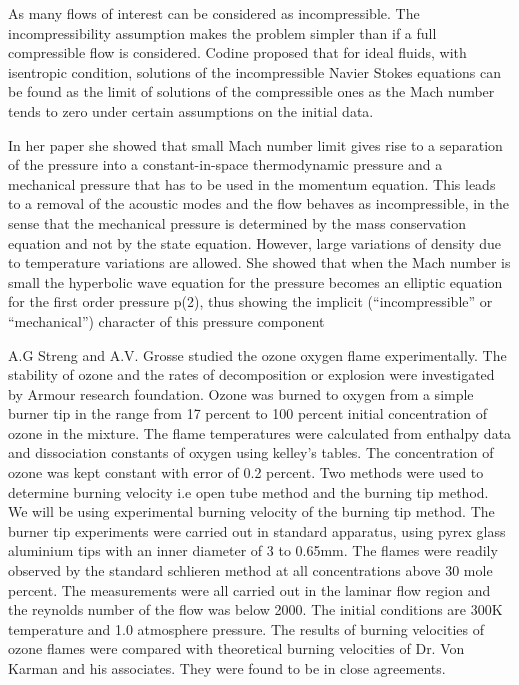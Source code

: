 \bigskip
\noindent As many flows of interest can be considered as incompressible. The incompressibility assumption makes the problem simpler than if a full compressible flow is considered. Codine  proposed that for ideal fluids, with isentropic condition, solutions of the incompressible Navier Stokes equations can be found as the limit of solutions of the compressible ones as the Mach number tends to zero under certain assumptions on the initial data.

\noindent In her paper she showed that small Mach number limit gives rise to a separation of the pressure into a constant-in-space thermodynamic pressure and a mechanical pressure that has to be used in the momentum equation. This leads to a removal of the acoustic modes and the flow behaves as incompressible, in the sense that the mechanical pressure is determined by the mass conservation
equation and not by the state equation. However, large variations of density
due to temperature variations are allowed. She showed that when the Mach number is small the hyperbolic wave equation for the pressure becomes an elliptic
equation for the first order pressure p(2), thus showing the implicit (“incompressible” or “mechanical”) character of this pressure component

\bigskip
\noindent A.G Streng and A.V. Grosse  studied the ozone oxygen flame experimentally. The stability of ozone and the rates of decomposition or explosion were investigated by Armour research foundation. Ozone was burned to oxygen from a simple burner tip in the range from 17 percent to 100 percent initial concentration of ozone in the mixture. The flame temperatures were calculated from enthalpy data and dissociation constants of oxygen using kelley's tables. The concentration of ozone was kept constant with error of   0.2 percent. Two methods were used to determine burning velocity i.e open tube method and the burning tip method. We will be using experimental burning velocity of the burning tip method. The burner tip experiments were carried out in standard apparatus, using pyrex glass aluminium tips with an inner diameter of 3 to 0.65mm. The flames were readily observed by the standard schlieren method at all concentrations above 30 mole percent. The measurements were all carried out in the laminar flow region and the reynolds number of the flow was below 2000. The initial conditions are 300K temperature and 1.0 atmosphere pressure. The results of burning velocities of ozone flames were compared with theoretical burning velocities of Dr. Von Karman and his associates. They were found to be in close agreements. 